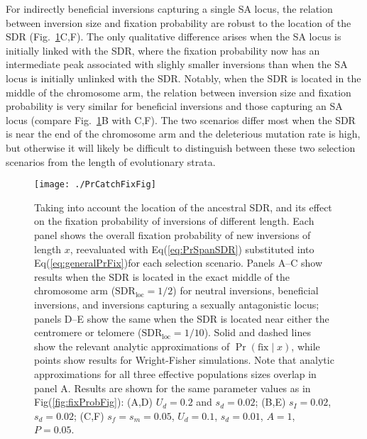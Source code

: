 \documentclass{article}
\begin{document}
For indirectly beneficial inversions capturing a single SA locus, the relation between inversion size and fixation probability are robust to the location of the SDR (Fig.~\ref{fig:probCatchFixFig}C,F). The only qualitative difference arises when the SA locus is initially linked with the SDR, where the fixation probability now has an intermediate peak associated with slighly smaller inversions than when the SA locus is initially unlinked with the SDR. Notably, when the SDR is located in the middle of the chromosome arm, the relation between inversion size and fixation probability is very similar for beneficial inversions and those capturing an SA locus (compare Fig.~\ref{fig:probCatchFixFig}B with C,F). The two scenarios differ most when the SDR is near the end of the chromosome arm and the deleterious mutation rate is high, but otherwise it will likely be difficult to distinguish between these two selection scenarios from the length of evolutionary strata.  \vspace{12pt}




 \begin{figure}[htbp]
 \centering
 \texttt{[image: ./PrCatchFixFig]}
 \caption{Taking into account the location of the ancestral SDR, and its effect on the fixation probability of inversions of different length. Each panel shows the overall fixation probability of new inversions of length $x$, reevaluated with Eq(\ref{eq:PrSpanSDR}) substituted into Eq(\ref{eq:generalPrFix})for each selection scenario. Panels A--C show results when the SDR is located in the exact middle of the chromosome arm ($\text{SDR}_\text{loc} = 1/2$) for neutral inversions, beneficial inversions, and inversions capturing a sexually antagonistic locus; panels D--E show the same when the SDR is located near either the centromere or telomere ($\text{SDR}_\text{loc} = 1/10$). Solid and dashed lines show the relevant analytic approximations of $\Pr(\text{fix} \mid x)$, while points show results for Wright-Fisher simulations. Note that analytic approximations for all three effective populations sizes overlap in panel A. Results are shown for the same parameter values as in Fig(\ref{fig:fixProbFig}): (A,D) $U_d = 0.2$ and $s_d = 0.02$; (B,E) $s_I = 0.02$, $s_d = 0.02$; (C,F) $s_f = s_m = 0.05$, $U_d = 0.1$, $s_d = 0.01$, $A = 1$, $P = 0.05$.}
 \label{fig:probCatchFixFig}
 \end{figure}
\end{document}
